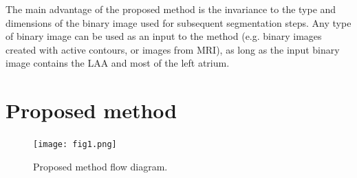 \documentclass[review]{elsarticle}
\begin{document}
The main advantage of the proposed method is the invariance to the type and dimensions 
of the binary image used for subsequent segmentation steps. Any type of binary image can be used 
as an input to the method (e.g. binary images created with active contours, or images 
from MRI), as long as the input binary image contains the LAA and most of the left atrium.







\section{ Proposed method}
\label{sec:proposed_method}

\begin{figure}[t]
  \centering
  \texttt{[image: fig1.png]}
  \caption{Proposed method flow diagram.
  }
  \label{fig:flow_diagram}  
\end{figure}
\end{document}
